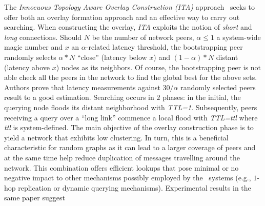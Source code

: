 The \emph{Innocuous Topology Aware Overlay Construction (ITA)}
approach~\cite{PRFM2013} seeks to offer both an overlay formation approach and
an effective way to carry out searching. When constructing the overlay,
\emph{ITA} exploits the notion of \emph{short} and \emph{long} connections.
Should $N$ be the number of network peers,  $\alpha \leq 1 $ a system-wide magic
number and $x$ an $\alpha$-related latency threshold, the bootstrapping peer
randomly selects $\alpha \ast N$ ``close'' (latency below $x$) and 
$\left( 1 - \alpha \right) \ast N$ distant (latency above $x$) nodes
as its neighbors. Of course, the bootstrapping peer is not able check all the
peers in the network to find the global best for the above sets. Authors
prove that latency measurements against $30/ \alpha$ randomly selected peers
result to a good estimation. 
Searching occurs in $2$ phases: in the initial, the querying node
floods its distant neighborhood  with \emph{TTL=1}.
Subsequently, peers receiving a query over a ``long link'' commence a 
local flood with \emph{TTL=ttl} where \emph{ttl} is system-defined.
The main objective of the overlay construction phase is to yield a network that
exhibits low clustering. In turn, this is a beneficial characteristic for
random graphs as it can lead to a larger coverage of peers and at the same time
help reduce duplication of messages travelling around the network. This
combination offers efficient lookups that pose minimal or no negative impact to
other mechanisms possibly employed by the \p\ systems (e.g., $1$-hop replication
or dynamic querying mechanisms). Experimental results in the same paper suggest
